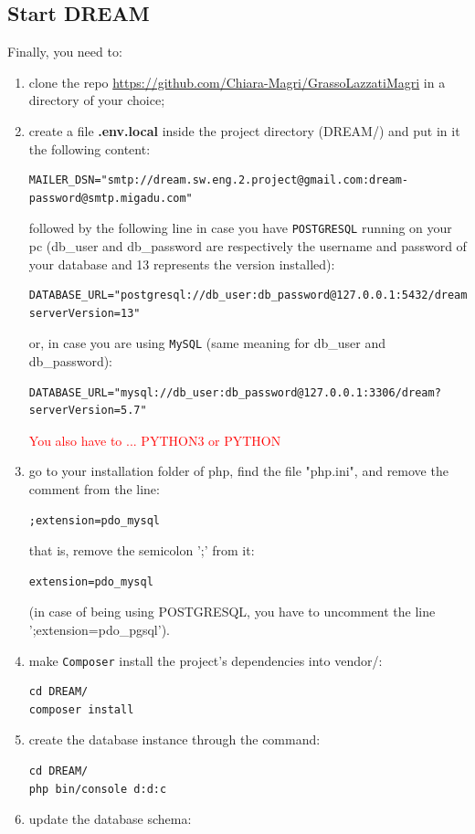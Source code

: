\documentclass{article}
\begin{document}
\subsection{Start DREAM}
Finally, you need to:
\begin{enumerate}
    \item clone the repo \url{https://github.com/Chiara-Magri/GrassoLazzatiMagri} in a directory of your choice;
\item create a file \textbf{.env.local} inside the project directory (DREAM/) and put in it the following content:
\begin{verbatim}
MAILER_DSN="smtp://dream.sw.eng.2.project@gmail.com:dream-password@smtp.migadu.com"
\end{verbatim}
followed by the following line in case you have \verb|POSTGRESQL| running on your pc (db\_user and db\_password are respectively the username and password of your database and 13 represents the version installed):
\begin{verbatim}
DATABASE_URL="postgresql://db_user:db_password@127.0.0.1:5432/dream?serverVersion=13"
\end{verbatim}
or, in case you are using \verb|MySQL| (same meaning for db\_user and db\_password):
\begin{verbatim}
DATABASE_URL="mysql://db_user:db_password@127.0.0.1:3306/dream?serverVersion=5.7"
\end{verbatim}
\textcolor{red}{You also have to ... PYTHON3 or PYTHON}
\item go to your installation folder of php, find the file "php.ini", and remove the comment from the line:
\begin{verbatim}
;extension=pdo_mysql
\end{verbatim}
that is, remove the semicolon ';' from it:
\begin{verbatim}
extension=pdo_mysql
\end{verbatim}
(in case of being using POSTGRESQL, you have to uncomment the line ';extension=pdo\_pgsql').
    \item make \verb|Composer| install the project's dependencies into vendor/:
    \begin{verbatim}
cd DREAM/
composer install
    \end{verbatim}
\item create the database instance through the command:
    \begin{verbatim}
cd DREAM/
php bin/console d:d:c
    \end{verbatim}
\item update the database schema:

\end{enumerate}
\end{document}
